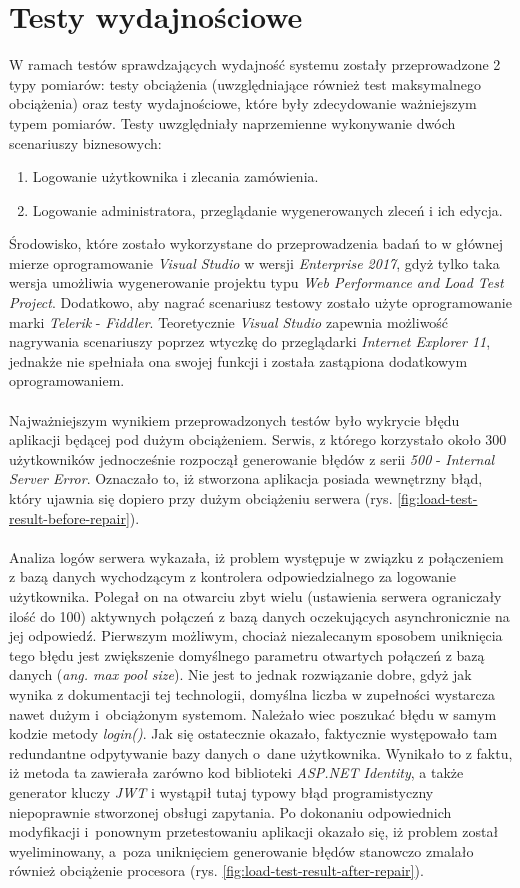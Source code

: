 \section{Testy wydajnościowe}
\quad W ramach testów sprawdzających wydajność systemu zostały przeprowadzone 2 typy pomiarów: testy obciążenia (uwzględniające również test maksymalnego obciążenia) oraz testy wydajnościowe, które były zdecydowanie ważniejszym typem pomiarów. Testy uwzględniały naprzemienne wykonywanie dwóch scenariuszy biznesowych:
\begin{enumerate}
    \item Logowanie użytkownika i zlecania zamówienia.
    \item Logowanie administratora, przeglądanie wygenerowanych zleceń i ich edycja.
\end{enumerate}
Środowisko, które zostało wykorzystane do przeprowadzenia badań to w głównej mierze oprogramowanie \textit{Visual Studio} w wersji \textit{Enterprise 2017}, gdyż tylko taka wersja umożliwia wygenerowanie projektu typu \textit{Web Performance and Load Test Project}. Dodatkowo, aby nagrać scenariusz testowy zostało użyte oprogramowanie marki \textit{Telerik} - \textit{Fiddler}. Teoretycznie \textit{Visual Studio} zapewnia możliwość nagrywania scenariuszy poprzez wtyczkę do przeglądarki \textit{Internet Explorer 11}, jednakże nie spełniała ona swojej funkcji i została zastąpiona dodatkowym oprogramowaniem.\\
\\
Najważniejszym wynikiem przeprowadzonych testów było wykrycie błędu aplikacji będącej pod dużym obciążeniem. Serwis, z którego korzystało około 300 użytkowników jednocześnie rozpoczął generowanie błędów z serii \textit{500} - \textit{Internal Server Error}. Oznaczało to, iż stworzona aplikacja posiada wewnętrzny błąd, który ujawnia się dopiero przy dużym obciążeniu serwera (rys. \ref{fig:load-test-result-before-repair}).\\
\\
Analiza logów serwera wykazała, iż problem występuje w związku z połączeniem z bazą danych wychodzącym z kontrolera odpowiedzialnego za logowanie użytkownika. Polegał on na otwarciu zbyt wielu (ustawienia serwera ograniczały ilość do 100) aktywnych połączeń z bazą danych oczekujących asynchronicznie na jej odpowiedź. Pierwszym możliwym, chociaż niezalecanym sposobem uniknięcia tego błędu jest zwiększenie domyślnego parametru otwartych połączeń z bazą danych (\textit{ang. max pool size}). Nie jest to jednak rozwiązanie dobre, gdyż jak wynika z dokumentacji tej technologii, domyślna liczba w zupełności wystarcza nawet dużym i~obciążonym systemom. Należało wiec poszukać błędu w samym kodzie metody \textit{login()}. Jak się ostatecznie okazało, faktycznie występowało tam redundantne odpytywanie bazy danych o~dane użytkownika. Wynikało to z faktu, iż metoda ta zawierała zarówno kod biblioteki \textit{ASP.NET Identity}, a także generator kluczy \textit{JWT} i wystąpił tutaj typowy błąd programistyczny niepoprawnie stworzonej obsługi zapytania. Po dokonaniu odpowiednich modyfikacji i~ponownym przetestowaniu aplikacji okazało się, iż problem został wyeliminowany, a~poza uniknięciem generowanie błędów stanowczo zmalało również obciążenie procesora (rys. \ref{fig:load-test-result-after-repair}).
